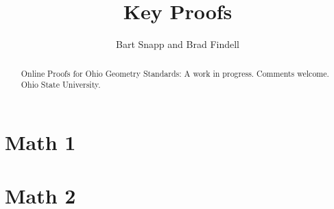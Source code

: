 \documentclass[handout,space,nooutcomes]{xourse}
\title{Key Proofs}
\author{Bart Snapp and Brad Findell}
\begin{document}
\begin{abstract}
Online Proofs for Ohio Geometry Standards:  A work in progress.  Comments welcome.  Ohio State University.
\end{abstract}
\maketitle

\part{Math 1}
\part{Math 2}
\end{document}
